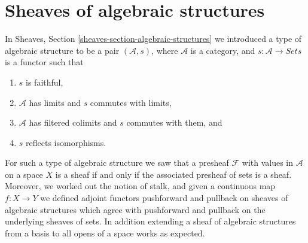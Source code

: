 \section{Sheaves of algebraic structures}
\label{section-sheaves-algebraic-structures}

\noindent
In Sheaves, Section \ref{sheaves-section-algebraic-structures}
we introduced a type of algebraic structure to be a pair
$(\mathcal{A}, s)$, where $\mathcal{A}$ is a category,
and $s : \mathcal{A} \to \textit{Sets}$ is a functor such
that
\begin{enumerate}
\item $s$ is faithful,
\item $\mathcal{A}$ has limits and $s$ commutes with limits,
\item $\mathcal{A}$ has filtered colimits and $s$ commutes with them, and
\item $s$ reflects isomorphisms.
\end{enumerate}
For such a type of algebraic structure we saw that a presheaf
$\mathcal{F}$ with values in $\mathcal{A}$ on a space $X$ is a sheaf if and
only if the associated presheaf of sets is a sheaf. Moreover,
we worked out the notion of stalk, and given a continuous map
$f : X \to Y$ we defined adjoint functors pushforward and pullback
on sheaves of algebraic structures which agree with pushforward
and pullback on the underlying sheaves of sets. In addition extending
a sheaf of algebraic structures from a basis to all opens
of a space works as expected.

